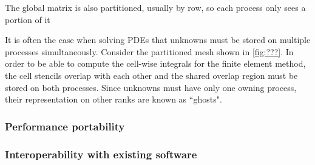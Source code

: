\documentclass[thesis]{subfiles}
\begin{document}
The global matrix is also partitioned, usually by row, so each process only sees a portion of it

It is often the case when solving PDEs that unknowns must be stored on multiple processes simultaneously.
Consider the partitioned mesh shown in \cref{fig:???}.
In order to be able to compute the cell-wise integrals for the finite element method, the cell stencils overlap with each other and the shared overlap region must be stored on both processes.
Since unknowns must have only one owning process, their representation on other ranks are known as ``ghosts".



\subsubsection{Performance portability}





\subsubsection{Interoperability with existing software}



\end{document}
